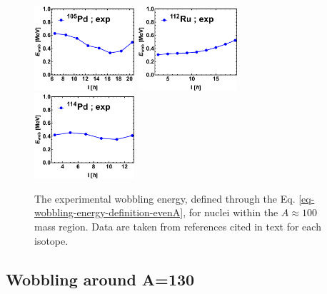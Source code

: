\begin{figure}
    \centering
    \includegraphics[width=0.33\textwidth]{Chapters/Figures/wobblers/105Pd.pdf}
    \includegraphics[width=0.33\textwidth]{Chapters/Figures/wobblers/112Ru.pdf}
    \includegraphics[width=0.33\textwidth]{Chapters/Figures/wobblers/114Pd.pdf}
    \caption{The experimental wobbling energy, defined through the Eq. \ref{eq-wobbling-energy-definition-evenA}, for nuclei within the $A\approx 100$ mass region. Data are taken from references cited in text for each isotope.}
    \label{wobblers-exp-set1}
\end{figure}

\subsection{Wobbling around A=130}

